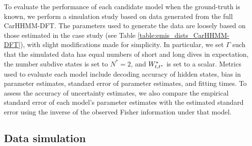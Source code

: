 

To evaluate the performance of each candidate model when the ground-truth is known, we perform a simulation study based on data generated from the full CarHHMM-DFT. The parameters used to generate the data are loosely based on those estimated in the case study (see Table \ref{table:emis_dists_CarHHMM-DFT}), with slight modifications made for simplicity. In particular, we set $\Gamma$ such that the simulated data has equal numbers of short and long dives in expectation, the number subdive states is set to $N^*=2$, and $W^*_{t,t^*}$ is set to a scalar. Metrics used to evaluate each model include decoding accuracy of hidden states, bias in parameter estimates, standard error of parameter estimates, and fitting times. To assess the accuracy of uncertainty estimates, we also compare the empirical standard error of each model's parameter estimates with the estimated standard error using the inverse of the observed Fisher information under that model.

\subsection{Data simulation}
\label{subsec:data_simulation}

